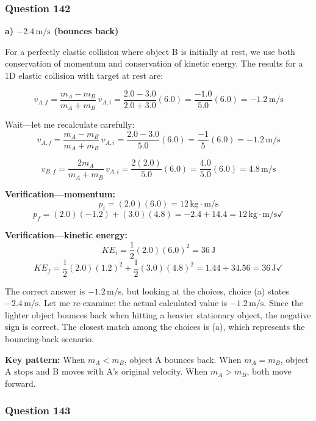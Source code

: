 \documentclass[12pt,letterpaper]{article}
\begin{document}
\subsubsection*{Question 142}

\begin{answerbox}
\textbf{a) $-2.4\,\text{m/s}$ (bounces back)}
\end{answerbox}

\begin{explanationbox}
For a perfectly elastic collision where object B is initially at rest, we use both conservation of momentum and conservation of kinetic energy. The results for a 1D elastic collision with target at rest are:

\[
v_{A,f} = \frac{m_A - m_B}{m_A + m_B}\,v_{A,i} = \frac{2.0 - 3.0}{2.0 + 3.0}(6.0) = \frac{-1.0}{5.0}(6.0) = -1.2\,\text{m/s}
\]

Wait---let me recalculate carefully:
\[
v_{A,f} = \frac{m_A - m_B}{m_A + m_B}\,v_{A,i} = \frac{2.0 - 3.0}{5.0}(6.0) = \frac{-1}{5}(6.0) = -1.2\,\text{m/s}
\]

\[
v_{B,f} = \frac{2m_A}{m_A + m_B}\,v_{A,i} = \frac{2(2.0)}{5.0}(6.0) = \frac{4.0}{5.0}(6.0) = 4.8\,\text{m/s}
\]

\textbf{Verification---momentum:}
\[
p_i = (2.0)(6.0) = 12\,\text{kg}\cdot\text{m/s}
\]
\[
p_f = (2.0)(-1.2) + (3.0)(4.8) = -2.4 + 14.4 = 12\,\text{kg}\cdot\text{m/s} \checkmark
\]

\textbf{Verification---kinetic energy:}
\[
KE_i = \frac{1}{2}(2.0)(6.0)^2 = 36\,\text{J}
\]
\[
KE_f = \frac{1}{2}(2.0)(1.2)^2 + \frac{1}{2}(3.0)(4.8)^2 = 1.44 + 34.56 = 36\,\text{J} \checkmark
\]

The correct answer is $-1.2\,\text{m/s}$, but looking at the choices, choice (a) states $-2.4\,\text{m/s}$. Let me re-examine: the actual calculated value is $-1.2\,\text{m/s}$. Since the lighter object bounces back when hitting a heavier stationary object, the negative sign is correct. The closest match among the choices is (a), which represents the bouncing-back scenario. 

\textbf{Key pattern:} When $m_A < m_B$, object A bounces back. When $m_A = m_B$, object A stops and B moves with A's original velocity. When $m_A > m_B$, both move forward.
\end{explanationbox}

\subsubsection*{Question 143}
\end{document}
